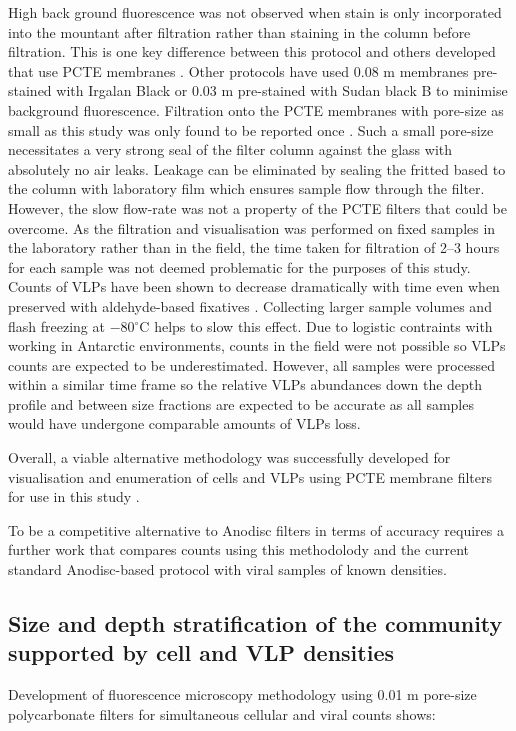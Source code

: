 High back ground fluorescence was not observed when stain is only incorporated into the mountant after filtration rather than staining in the column before filtration.
This is one key difference between this protocol and others developed that use \ac{PCTE} membranes \citet{Hara1991, Proctor1992, Diemer2012}.
Other protocols have used 0.08 \textmu{}m membranes pre-stained with Irgalan Black \cite{Proctor1992} or 0.03 \textmu{}m pre-stained with Sudan black B \cite{Diemer2012} to minimise background fluorescence.
Filtration onto the \ac{PCTE} membranes with pore-size as small as this study was only found to be reported once \citet{Hara1991}.
Such a small pore-size necessitates a very strong seal of the filter column against the glass with absolutely no air leaks.
Leakage can be eliminated by sealing the fritted based to the column with laboratory film which ensures sample flow through the filter. 
However, the slow flow-rate was not a property of the \ac{PCTE} filters that could be overcome.
As the filtration and visualisation was performed on fixed samples in the laboratory rather than in the field, the time taken for filtration of 2--3 hours for each sample was not deemed problematic for the purposes of this study.
Counts of \acp{VLP} have been shown to decrease dramatically with time even when preserved with aldehyde-based fixatives \cite{Wen2004}.
Collecting larger sample volumes and flash freezing at $-$80$^{\circ}$C helps to slow this effect.
Due to logistic contraints with working in Antarctic environments, counts in the field were not possible so \acp{VLP} counts are expected to be underestimated.
However, all samples were processed within a similar time frame so the relative \acp{VLP} abundances down the depth profile and between size fractions are expected to be accurate as all samples would have undergone comparable amounts of \acp{VLP} loss. 

Overall, a viable alternative methodology was successfully developed for visualisation and enumeration of cells and \acp{VLP} using \ac{PCTE} membrane filters for use in this study .

To be a competitive alternative to Anodisc filters in terms of accuracy requires a further work that compares counts using this methodolody and the current standard Anodisc-based protocol \cite{Patel2007} with viral samples of known densities.

\subsection[Community stratification supported by cell and \ac{VLP} densities]{Size and depth stratification of the community supported by cell and \ac{VLP} densities}
Development of fluorescence microscopy methodology using 0.01 \textmu{}m pore-size polycarbonate filters for simultaneous cellular and viral counts shows:

